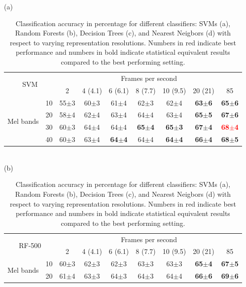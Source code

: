 \documentclass[final,3p,times,twocolumn]{elsarticle}
\begin{document}
\begin{table}[h]
\centering
\caption{Classification accuracy in percentage for different classifiers: SVMs (a), Random Forests (b), Decision Trees (c), and Nearest Neigbors (d) with respect to varying representation resolutions. Numbers in red indicate best performance and numbers in bold indicate statistical equivalent results compared to the best performing setting.}
\label{T2}
(a)\\
\begin{tabular}{ll|c|c|c|c|c|c|c|}
\cline{3-9}
\multicolumn{2}{c}{\multirow{2}{*}{SVM}} & \multicolumn{7}{|c|}{Frames per second}\\ \cline{3-9}
 & & 2 & 4 (4.1) & 6 (6.1) & 8 (7.7) & 10 (9.5) & 20 (21) & 85 \\ \cline{1-9}
\multicolumn{1}{|c}{\multirow{4}{*}{Mel bands}}
 & \multicolumn{1}{|c|}{10} & 55$\pm$3 & 60$\pm$3 & 61$\pm$4 & 62$\pm$3 & 62$\pm$4 & \textbf{63$\pm$6} & \textbf{65$\pm$6} \\ \cline{2-9}
\multicolumn{1}{|c}{}
 & \multicolumn{1}{|c|}{20} & 58$\pm$4 & 62$\pm$4 & 63$\pm$4 & 64$\pm$4 & 63$\pm$4 & \textbf{65$\pm$5} & \textbf{67$\pm$6} \\ \cline{2-9}
\multicolumn{1}{|c}{}
 & \multicolumn{1}{|c|}{30} & 60$\pm$3 & 64$\pm$4 & 64$\pm$4 & \textbf{65$\pm$4} & \textbf{65$\pm$3} & \textbf{67$\pm$4} & \textbf{\textcolor{red}{68$\pm$4}} \\ \cline{2-9}
\multicolumn{1}{|c}{}
 & \multicolumn{1}{|c|}{40} & 60$\pm$3 & 63$\pm$4 & \textbf{64$\pm$4} & 64$\pm$4 & \textbf{64$\pm$4} & \textbf{66$\pm$4} & \textbf{68$\pm$5} \\ \cline{1-9}
\end{tabular}
\\(b)\\
\begin{tabular}{ll|c|c|c|c|c|c|c|}
\cline{3-9}
\multicolumn{2}{c}{\multirow{2}{*}{RF-500}} & \multicolumn{7}{|c|}{Frames per second}\\ \cline{3-9}
 & & 2 & 4 (4.1) & 6 (6.1) & 8 (7.7) & 10 (9.5) & 20 (21) & 85 \\ \cline{1-9}
\multicolumn{1}{|c}{\multirow{4}{*}{Mel bands}}
 & \multicolumn{1}{|c|}{10} & 60$\pm$3 & 62$\pm$3 & 62$\pm$3 & 63$\pm$3 & 63$\pm$3 & \textbf{65$\pm$4} & \textbf{67$\pm$5} \\ \cline{2-9}
\multicolumn{1}{|c}{}
 & \multicolumn{1}{|c|}{20} & 61$\pm$4 & 63$\pm$3 & 64$\pm$3 & 64$\pm$3 & 64$\pm$4 & \textbf{66$\pm$6} & \textbf{69$\pm$6} \\ \cline{2-9}

\end{tabular}
\end{table}
\end{document}
